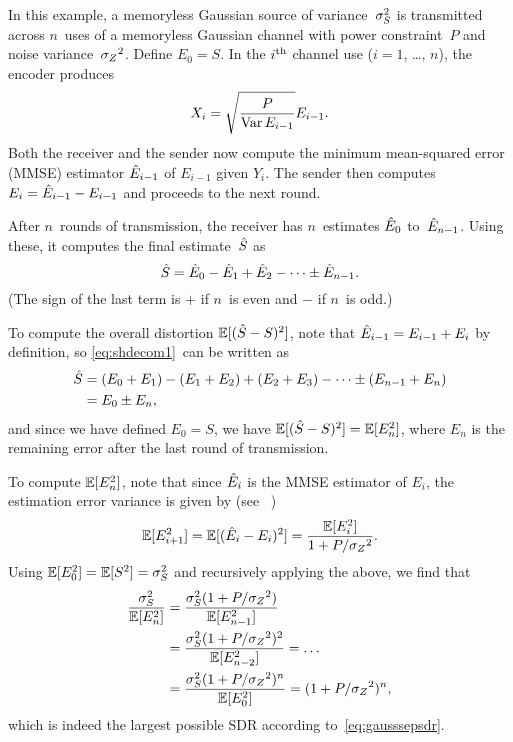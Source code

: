 \begin{example}
  \label{ex:gaussfb}
  In this example, a memoryless Gaussian source of variance~${\sigma_S^2}$ is
  transmitted across $n$~uses of a memoryless Gaussian channel with power
  constraint~$P$ and noise variance~${{\sigma_Z}^2}$.  Define $E_0 = S$. In the $i{^{\text{th}}}$
  channel use ($i = 1$, \dots, $n$), the encoder produces
  \begin{equation}
    \label{eq:gaussfbxi}
    X_i = \sqrt{\frac{P}{\operatorname{Var} E_{i-1}}} E_{i-1}.
  \end{equation}
  Both the receiver and the sender now compute the minimum mean-squared
  error (MMSE) estimator $\hat{E}_{i-1}$ of $E_{i-1}$ given $Y_i$. The sender then
  computes $E_i = \hat{E}_{i-1} - E_{i-1}$ and proceeds to the next round.

  After $n$~rounds of transmission, the receiver has $n$~estimates $\hat{E}_0$
  to~$\hat{E}_{n-1}$. Using these, it computes the final estimate~${\hat{S}}$ as
  \begin{equation}
    \label{eq:shdecom1}
    {\hat{S}} = \hat{E}_0 - \hat{E}_1 + \hat{E}_2 - \cdots \pm \hat{E}_{n-1}.
  \end{equation}
  (The sign of the last term is $+$ if $n$~is even and $-$ if $n$~is odd.)

  To compute the overall distortion ${\mathbb{E}[({\hat{S}} - S)^2]}$, note that $\hat{E}_{i-1} = E_{i-1} +
  E_i$ by definition, so \eqref{eq:shdecom1}~can be written as
  \begin{align*}
    {\hat{S}} &= (E_0 + E_1) - (E_1 + E_2) + (E_2 + E_3) - \cdots \pm (E_{n-1} + E_n)
    \\
    &= E_0 \pm E_n,
  \end{align*}
  and since we have defined $E_0 = S$, we have ${\mathbb{E}[({\hat{S}} - S)^2]} = \mathbb{E}[E_n^2]$, where $E_n$
  is the remaining error after the last round of transmission.

  To compute $\mathbb{E}[E_n^2]$, note that since $\hat{E}_i$ is the MMSE estimator of
  $E_i$, the estimation error variance is given by (see
  \eg~\cite[Section~8.3]{Scharf1990})
  \begin{equation}
    \label{eq:gaussvardec}
    \mathbb{E}[E_{i+1}^2] = \mathbb{E}[(\hat{E}_i - E_i)^2] = \frac{\mathbb{E}[E_i^2]}{1 + P/{{\sigma_Z}^2}}.
  \end{equation}
  Using $\mathbb{E}[E_0^2] = \mathbb{E}[S^2] = {\sigma_S^2}$ and recursively applying the above, we find
  that
  \begin{align*}
    \frac{{\sigma_S^2}}{\mathbb{E}[E_n^2]} &= \frac{{\sigma_S^2} (1 + P/{{\sigma_Z}^2})}{\mathbb{E}[E_{n-1}^2]} \\
    &= \frac{{\sigma_S^2}(1 + P/{{\sigma_Z}^2})^2}{\mathbb{E}[E_{n-2}^2]} = \dots \\
    &= \frac{{\sigma_S^2}(1 + P/{{\sigma_Z}^2})^n}{\mathbb{E}[E_0^2]} = (1 + P/{{\sigma_Z}^2})^n,
  \end{align*}
  which is indeed the largest possible SDR according to~\eqref{eq:gausssepsdr}.
\end{example}

